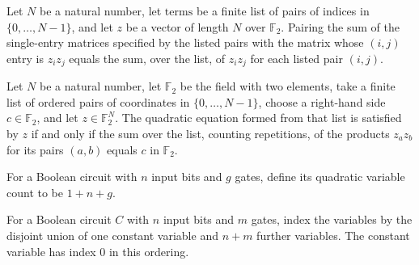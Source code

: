 \begin{theorem}
\label{FABL.binaryMatrixPairing_sum_single}
\leanok
{}
Let $N$ be a natural number, let $\mathrm{terms}$ be a finite list of pairs of indices
in $\{0,\ldots,N-1\}$, and let $z$ be a vector of length $N$ over $\mathbb{F}_2$.
Pairing the sum of the single-entry matrices specified by the listed pairs with the
matrix whose $(i,j)$ entry is $z_i z_j$ equals the sum, over the list, of $z_i z_j$ for
each listed pair $(i,j)$.
\end{theorem}

\begin{theorem}
\label{FABL.homogeneousQuadraticEquationOfTerms_satisfiedBy_iff}
\leanok
{}
Let $N$ be a natural number, let $\mathbb F_2$ be the field with two elements, take a
finite list of ordered pairs of coordinates in $\{0,\ldots,N-1\}$, choose a right-hand
side $c\in\mathbb F_2$, and let $z\in\mathbb F_2^N$. The quadratic equation formed from
that list is satisfied by $z$ if and only if the sum over the list, counting
repetitions, of the products $z_a z_b$ for its pairs $(a,b)$ equals $c$ in $\mathbb
F_2$.
\end{theorem}

\begin{definition}
\label{FABL.BooleanCircuit.circuitQuadraticVariableCount}
\leanok
{}
For a Boolean circuit with $n$ input bits and $g$ gates, define its quadratic variable
count to be $1+n+g$.
\end{definition}

\begin{definition}
\label{FABL.BooleanCircuit.circuitQuadraticConstantIndex}
\leanok
{}
For a Boolean circuit $C$ with $n$ input bits and $m$ gates, index the variables by the
disjoint union of one constant variable and $n+m$ further variables. The constant
variable has index $0$ in this ordering.
\end{definition}

